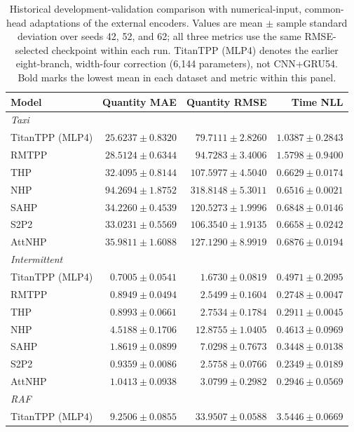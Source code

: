 \documentclass[runningheads]{llncs}
\begin{document}
\begin{table}[p]
\caption{Historical development-validation comparison with numerical-input, common-head adaptations of the external encoders. Values are mean $\pm$ sample standard deviation over seeds 42, 52, and 62; all three metrics use the same RMSE-selected checkpoint within each run. TitanTPP (MLP4) denotes the earlier eight-branch, width-four correction (6,144 parameters), not CNN+GRU54. Bold marks the lowest mean in each dataset and metric within this panel.}
\label{tab:external-legacy}\centering\small
\begin{tabular}{lrrr}
\toprule
Model & Quantity MAE & Quantity RMSE & Time NLL\\
\midrule
\multicolumn{4}{l}{\textit{Taxi}}\\
TitanTPP (MLP4) & $\mathbf{25.6237\pm0.8320}$ & $\mathbf{79.7111\pm2.8260}$ & $1.0387\pm0.2843$\\
RMTPP & $28.5124\pm0.6344$ & $94.7283\pm3.4006$ & $1.5798\pm0.9400$\\
THP & $32.4095\pm0.8144$ & $107.5977\pm4.5040$ & $0.6629\pm0.0174$\\
NHP & $94.2694\pm1.8752$ & $318.8148\pm5.3011$ & $\mathbf{0.6516\pm0.0021}$\\
SAHP & $34.2260\pm0.4539$ & $120.5273\pm1.9996$ & $0.6848\pm0.0146$\\
S2P2 & $33.0231\pm0.5569$ & $106.3540\pm1.9135$ & $0.6658\pm0.0242$\\
AttNHP & $35.9811\pm1.6088$ & $127.1290\pm8.9919$ & $0.6876\pm0.0194$\\
\midrule
\multicolumn{4}{l}{\textit{Intermittent}}\\
TitanTPP (MLP4) & $\mathbf{0.7005\pm0.0541}$ & $\mathbf{1.6730\pm0.0819}$ & $0.4971\pm0.2095$\\
RMTPP & $0.8949\pm0.0494$ & $2.5499\pm0.1604$ & $0.2748\pm0.0047$\\
THP & $0.8993\pm0.0661$ & $2.7534\pm0.1784$ & $0.2911\pm0.0045$\\
NHP & $4.5188\pm0.1706$ & $12.8755\pm1.0405$ & $0.4613\pm0.0969$\\
SAHP & $1.8619\pm0.0899$ & $7.0298\pm0.7673$ & $0.3448\pm0.0138$\\
S2P2 & $0.9359\pm0.0086$ & $2.5758\pm0.0766$ & $\mathbf{0.2349\pm0.0189}$\\
AttNHP & $1.0413\pm0.0938$ & $3.0799\pm0.2982$ & $0.2946\pm0.0569$\\
\midrule
\multicolumn{4}{l}{\textit{RAF}}\\
TitanTPP (MLP4) & $9.2506\pm0.0855$ & $\mathbf{33.9507\pm0.0588}$ & $3.5446\pm0.0669$\\

\end{tabular}
\end{table}
\end{document}
